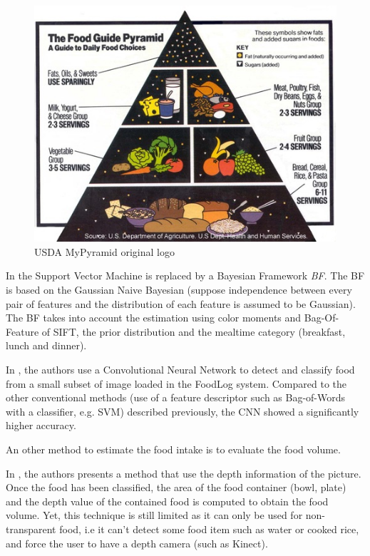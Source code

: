 \begin{figure}
    \centering
    \includegraphics[scale=0.8]{img/my_pyramid.jpg}
    \caption{USDA MyPyramid original logo}
    \label{fig:my_pyramid}
\end{figure}

In \cite{Aizawa2013} the Support Vector Machine is replaced by a Bayesian Framework \textit{BF}.
The BF is based on the Gaussian Naive Bayesian (suppose independence between every pair of features and the distribution of each feature is assumed to be Gaussian). The BF takes into account the estimation using color moments and Bag-Of-Feature of SIFT, the prior distribution and the mealtime category (breakfast, lunch and dinner).

In \cite{Kagaya2014}, the authors use a Convolutional Neural Network  to detect and classify food from a small subset of image loaded in the FoodLog system. Compared to the other conventional methods (use of a feature descriptor such as Bag-of-Words with a classifier, e.g. SVM) described previously, the CNN showed a significantly higher accuracy.


An other method to estimate the food intake is to evaluate the food volume.

In \cite{Chen2012}, the authors presents a method that use the depth information of the picture. Once the food has been classified, the area of the food container (bowl, plate) and the depth value of the contained food is computed to obtain the food volume.
Yet, this technique is still limited as it can only be used for non-transparent food, i.e it can't detect some food item such as water or cooked rice, and force the user to have a depth camera (such as Kinect).

